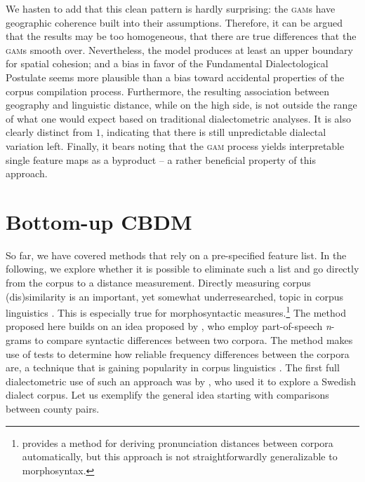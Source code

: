 \documentclass[output=paper]{LSP/langsci}
\begin{document}
We hasten to add that this clean pattern is hardly surprising: the \textsc{gam}s have geographic coherence built into their assumptions. 
Therefore, it can be argued that the results may be too homogeneous, that there are true differences that the \textsc{gam}s smooth over.
Nevertheless, the model produces at least an upper boundary for spatial cohesion; and a bias in favor of the Fundamental Dialectological Postulate seems more plausible than a bias toward accidental properties of the corpus compilation process.
Furthermore, the resulting association between geography and linguistic distance, while on the high side, is not outside the range of what one would expect based on traditional dialectometric analyses.
It is also clearly distinct from $1$, indicating that there is still unpredictable dialectal variation left.
Finally, it bears noting that the \textsc{gam} process yields interpretable single feature maps as a byproduct -- a rather beneficial property of this approach.

\section{Bottom-up CBDM} \label{bottomup}

So far, we have covered methods that rely on a pre-specified feature list.
In the following, we explore whether it is possible to eliminate such a list and go directly from the corpus to a distance measurement.
Directly measuring corpus (dis)similarity is an important, yet somewhat underresearched, topic in corpus linguistics \citep{kilgarriff_comparing_2001}.
This is especially true for morphosyntactic measures.\footnote{\citet{scherrer_recovering_2012} provides a method for deriving pronunciation distances between corpora automatically, but this approach is not straightforwardly generalizable to morphosyntax.}
The method proposed here builds on an idea proposed by \citet{nerbonne_measure_2006}, who employ part-of-speech \emph{n}-grams to compare syntactic differences between two corpora.
The method makes use of  tests to determine how reliable frequency differences between the corpora are, a technique that is gaining popularity in corpus linguistics \citep{lijffijt_computational_2013}.
The first full dialectometric use of such an approach was by \citet{sanders_statistical_2010}, who used it to explore a Swedish dialect corpus.
Let us exemplify the general idea starting with comparisons between county pairs.
\end{document}
